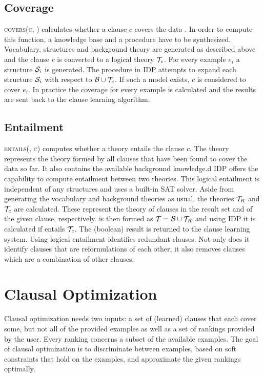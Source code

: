 \subsection{Coverage}
\textsc{covers(c, )} calculates whether a clause $c$ covers the data .
In order to compute this function, a knowledge base and a procedure have to be synthesized.
Vocabulary, structures and background theory are generated as described above and the clause $c$ is converted to a logical theory $\mathcal{T}_c$.
For every example $e_i$ a structure $\mathcal{S}_i$ is generated.
The procedure in IDP attempts to expand each structure $\mathcal{S}_i$ with respect to $\mathcal{B} \cup \mathcal{T}_c$.
If such a model exists, $c$ is considered to cover $e_i$.
In practice the coverage for every example is calculated and the results are sent back to the clause learning algorithm.

\subsection{Entailment}
\textsc{entails(, c)} computes whether a theory  entails the clause $c$.
The theory  represents the theory formed by all clauses that have been found to cover the data so far.
It also contains the available background knowledge.d
IDP offers the capability to compute entailment between two theories.
This logical entailment is independent of any structures and uses a built-in SAT solver.
Aside from generating the vocabulary and background theories as usual, the theories $\mathcal{T}_R$ and $\mathcal{T}_c$ are calculated.
These represent the theory of clauses in the result set and of the given clause, respectively.
 is then formed as $\mathcal{T} = \mathcal{B} \cup \mathcal{T}_R$ and using IDP it is calculated if  entails $\mathcal{T}_c$.
The (boolean) result is returned to the clause learning system.
Using logical entailment identifies redundant clauses.
Not only does it identify clauses that are reformulations of each other, it also removes clauses which are a combination of other clauses.

\section{Clausal Optimization}
\label{sec:clausal_opt_approach}
Clausal optimization needs two inputs: a set of (learned) clauses that each cover some, but not all of the provided examples as well as a set of rankings provided by the user.
Every ranking concerns a subset of the available examples.
The goal of clausal optimization is to discriminate between examples, based on soft constraints that hold on the examples, and approximate the given rankings optimally.


